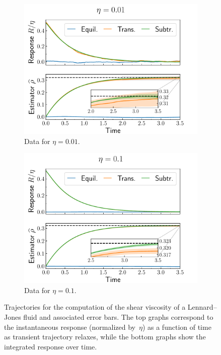 \begin{figure}[h!]
\centering
\begin{subfigure}{0.49\textwidth}
    \includegraphics[width=\textwidth]{LJ_shear_0.01.pdf}
    \caption{Data for $\eta = 0.01$.}
    \label{subfig:shear_0.01}
\end{subfigure}
\hfill
\begin{subfigure}{0.49\textwidth}
    \includegraphics[width=\textwidth]{LJ_shear_0.1.pdf}
    \caption{Data for $\eta = 0.1$.}
    \label{subfig:shear_0.1}
\end{subfigure}
\caption{Trajectories for the computation of the shear viscosity of a Lennard--Jones fluid and associated error bars. The top graphs correspond to the instantaneous response (normalized by~$\eta$) as a function of time as transient trajectory relaxes, while the bottom graphs show the integrated response over time.}
\label{fig:LJ_shear}
\end{figure}

